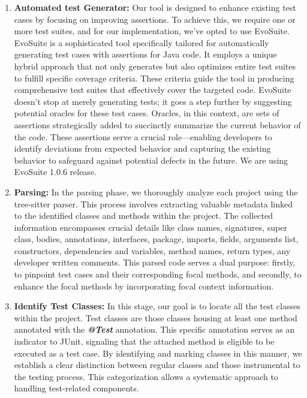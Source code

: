 \begin{enumerate}
    \item \textbf{Automated test Generator:} Our tool is designed to enhance existing test cases by focusing on improving assertions. To achieve this, we require one or more test suites, and for our implementation, we've opted to use EvoSuite. EvoSuite\cite{noauthor_evosuite_nodate} is a sophisticated tool specifically tailored for automatically generating test cases with assertions for Java code. It employs a unique hybrid approach that not only generates but also optimizes entire test suites to fulfill specific coverage criteria. These criteria guide the tool in producing comprehensive test suites that effectively cover the targeted code. EvoSuite doesn't stop at merely generating tests; it goes a step further by suggesting potential oracles for these test cases. Oracles, in this context, are sets of assertions strategically added to succinctly summarize the current behavior of the code. These assertions serve a crucial role—enabling developers to identify deviations from expected behavior and capturing the existing behavior to safeguard against potential defects in the future. We are using EvoSuite 1.0.6 release\cite{EvoSuite_release}.
    
    \item \textbf{Parsing:} In the parsing phase, we thoroughly analyze each project using the tree-sitter parser\cite{noauthor_tree-sitterintroduction_nodate}. This process involves extracting valuable metadata linked to the identified classes and methods within the project. The collected information encompasses crucial details like class names, signatures, super class, bodies, annotations, interfaces, package, imports, fields, arguments list, constructors, dependencies and variables, method names, return types, any developer written comments. This parsed code serves a dual purpose: firstly, to pinpoint test cases and their corresponding focal methods, and secondly, to enhance the focal methods by incorporating focal context information.
                                
    \item \textbf{Identify Test Classes:} In this stage, our goal is to locate all the test classes within the project. Test classes are those classes housing at least one method annotated with the \textit{\textbf{@Test}} annotation. This specific annotation serves as an indicator to JUnit, signaling that the attached method is eligible to be executed as a test case. By identifying and marking classes in this manner, we establish a clear distinction between regular classes and those instrumental to the testing process. This categorization allows a systematic approach to handling test-related components.


\end{enumerate}
